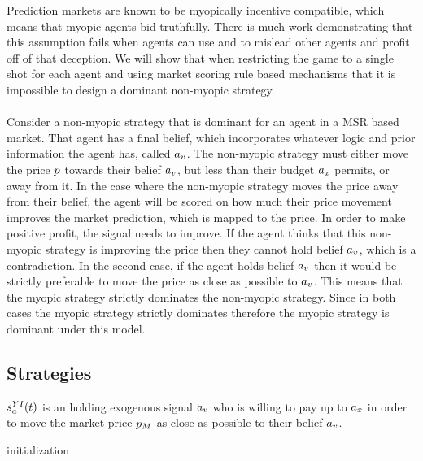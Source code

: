 Prediction markets are known to be myopically incentive compatible, which means that myopic agents bid truthfully. There is much work demonstrating that this assumption fails when agents can use  and  to mislead other agents and profit off of that deception. We will show that when restricting the game to a single shot for each agent and using market scoring rule based mechanisms that it is impossible to design a dominant non-myopic strategy.\\

 \\
Consider a non-myopic strategy that is dominant for an agent in a MSR based market. That agent has a final belief, which incorporates whatever logic and prior information the agent has, called $a_v$. The non-myopic strategy must either move the price $p$ towards their belief $a_v$, but less than their budget $a_x$ permits, or away from it. In the case where the non-myopic strategy moves the price away from their belief, the agent will be scored on how much their price movement improves the market prediction, which is mapped to the price. In order to make positive profit, the signal needs to improve. If the agent thinks that this non-myopic strategy is improving the price then they cannot hold belief $a_v$, which is a contradiction. In the second case, if the agent holds belief $a_v$ then it would be strictly preferable to move the price as close as possible to $a_v$. This means that the myopic strategy strictly dominates the non-myopic strategy. Since in both cases the myopic strategy strictly dominates therefore the myopic strategy is dominant under this model.\\

\subsection{Strategies}
$s^{YI}_a(t)$ is an  holding exogenous signal $a_v$ who is willing to pay up to $a_x$ in order to move the market price $p_M$ as close as possible to their belief $a_v$. \\

\begin{algorithm}[H]
\SetAlgoLined
{}
initialization\;
\end{algorithm}

